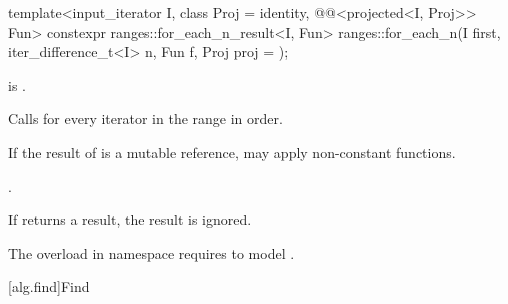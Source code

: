 %
\begin{itemdecl}
template<input_iterator I, class Proj = identity,
         @@<projected<I, Proj>> Fun>
  constexpr ranges::for_each_n_result<I, Fun>
    ranges::for_each_n(I first, iter_difference_t<I> n, Fun f, Proj proj = {});
\end{itemdecl}

\begin{itemdescr}
\pnum
\expects
{} is .

\pnum
\effects
Calls 
for every iterator  in the range
 in order.
\begin{note}
If the result of  is a mutable reference,
 may apply non-constant functions.
\end{note}

\pnum
\returns
{}.

\pnum
\remarks
If  returns a result, the result is ignored.

\pnum
\begin{note}
The overload in namespace 
requires  to model .
\end{note}
\end{itemdescr}

[alg.find]{Find}

